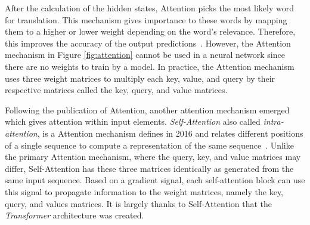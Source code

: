 After the calculation of the hidden states, Attention picks the most likely word
for translation. This mechanism gives importance to these words by mapping them
to a higher or lower weight depending on the word’s relevance. Therefore, this
improves the accuracy of the output predictions~\citep{bahdanau}. However, the
Attention mechanism in Figure \ref{fig:attention} cannot be used in a neural
network since there are no weights to train by a model. In practice, the
Attention mechanism uses three weight matrices to multiply each key, value, and
query by their respective matrices called the key, query, and value matrices.

Following the publication of Attention, another attention mechanism emerged
which gives attention within input elements. \emph{Self-Attention} also called
\emph{intra-attention}, is a Attention mechanism defines in 2016 and relates
different positions of a single sequence to compute a representation of the same
sequence~\citep{Cheng}. Unlike the primary Attention mechanism, where the query,
key, and value matrices may differ, Self-Attention has these three matrices
identically as generated from the same input sequence. Based on a gradient
signal, each self-attention block can use this signal to propagate information
to the weight matrices, namely the key, query, and values matrices. It is
largely thanks to Self-Attention that the \emph{Transformer} architecture was
created.

